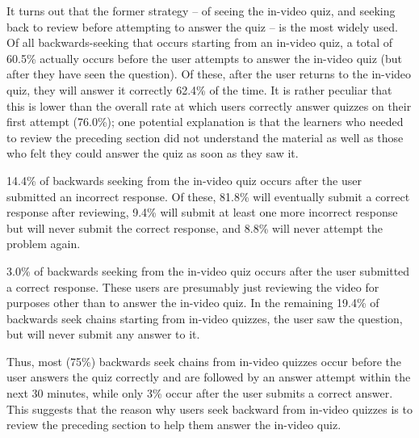 \documentclass{sigchi}
\begin{document}
It turns out that the former strategy -- of seeing the in-video quiz, and seeking back to review before attempting to answer the quiz -- is the most widely used. Of all backwards-seeking that occurs starting from an in-video quiz, a total of 60.5\% actually occurs before the user attempts to answer the in-video quiz (but after they have seen the question). Of these, after the user returns to the in-video quiz, they will answer it correctly 62.4\% of the time. It is rather peculiar that this is lower than the overall rate at which users correctly answer quizzes on their first attempt (76.0\%); one potential explanation is that the learners who needed to review the preceding section did not understand the material as well as those who felt they could answer the quiz as soon as they saw it.

14.4\% of backwards seeking from the in-video quiz occurs after the user submitted an incorrect response. Of these, 81.8\% will eventually submit a correct response after reviewing, 9.4\% will submit at least one more incorrect response but will never submit the correct response, and 8.8\% will never attempt the problem again.

3.0\% of backwards seeking from the in-video quiz occurs after the user submitted a correct response. These users are presumably just reviewing the video for purposes other than to answer the in-video quiz. In the remaining 19.4\% of backwards seek chains starting from in-video quizzes, the user saw the question, but will never submit any answer to it.

Thus, most (75\%) backwards seek chains from in-video quizzes occur before the user answers the quiz correctly and are followed by an answer attempt within the next 30 minutes, while only 3\% occur after the user submits a correct answer. This suggests that the reason why users seek backward from in-video quizzes is to review the preceding section to help them answer the in-video quiz.

\end{document}
